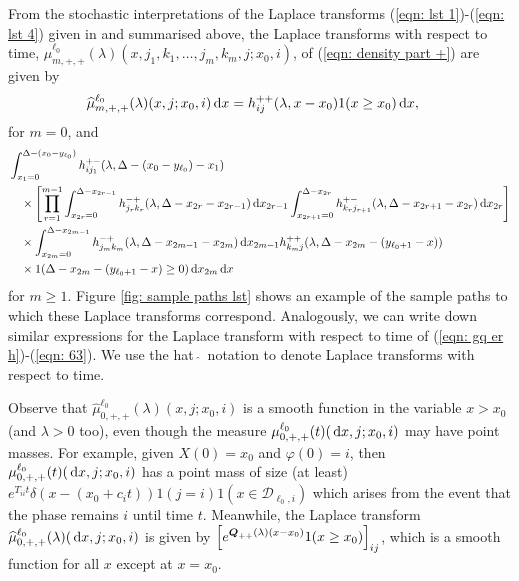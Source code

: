 From the stochastic interpretations of the Laplace transforms (\ref{eqn: lst 1})-(\ref{eqn: lst 4}) given in \citep{bean2005} and summarised above, the Laplace transforms with respect to time, \(\widehat \mu^{\ell_0}_{m,+,+}(\lambda)( x, j_1,k_1,\dots,j_m,k_m, j; x_0,i)\), of (\ref{eqn: density part +}) are given by 
\begin{align*}
	\widehat \mu^{\ell_0}_{m,+,+}(\lambda)( x,j;x_0,i) \, \mathrm{d} x&= h_{ij}^{++}(\lambda,x-x_0)1(x\geq x_0)\, \mathrm{d} x,
\end{align*}
for \(m=0\),  and 
\begin{align}
	\nonumber&\int_{x_1 = 0}^{\Delta-(x_0-y_{\ell_0})} h_{ij_1}^{+-}(\lambda,\Delta-(x_0-y_{\ell_0})-x_1)  %
	\\& \quad \nonumber\times\left[\prod_{r=1}^{m-1} \int_{x_{2r}=0}^{\Delta-x_{2r-1}} h_{j_rk_r}^{-+}(\lambda,\Delta-x_{2r}-x_{2r-1})\wrt x_{2r-1}\int_{x_{2r+1}=0}^{\Delta-x_{2r}}h_{k_{r}j_{r+1}}^{+-}(\lambda,\Delta-x_{2r+1}-x_{2r})\wrt x_{2r}\right]
	\\&\quad\times \int_{x_{2m}=0}^{\Delta-x_{2m-1}} h_{j_{m}k_{m}}^{-+}(\lambda,\Delta -x_{2m-1} - x_{2m}) \wrt x_{2m-1}h_{k_mj}^{++}(\lambda,\Delta -x_{2m}- (y_{\ell_0+1}- x))\nonumber	
	\\&\quad\times 1(\Delta-x_{2m}-(y_{\ell_0+1}-x)\geq 0)\wrt x_{2m} \wrt x \label{eqn: lst herwe}
\end{align} 
for \(m\geq 1\). Figure \ref{fig: sample paths lst} shows an example of the sample paths to which these Laplace transforms correspond.  Analogously, we can write down similar expressions for the Laplace transform with respect to time of (\ref{eqn: gq er h})-(\ref{eqn: 63}). We use the hat \(\,\widehat{}\,\)  notation to denote Laplace transforms with respect to time. 

Observe that \(\widehat \mu^{\ell_0}_{0,+,+}(\lambda)(x,j;x_0,i)\) is a smooth function in the variable \(x> x_0\) (and \(\lambda>0\) too), even though the measure \(\mu^{\ell_0}_{0,+,+}(t)(\, \mathrm{d} x,j;x_0,i)\) may have point masses. For example, given \(X(0)=x_0\) and \(\varphi(0)=i\), then \(\mu^{\ell_0}_{0,+,+}(t)(\, \mathrm{d} x,j;x_0,i)\) has a point mass of size (at least) \(e^{T_{ii}t}\delta(x-(x_0+c_it))1(j=i)1(x\in\mathcal D_{\ell_0,i})\) which arises from the event that the phase remains \(i\) until time \(t\). Meanwhile, the Laplace transform \(\widehat \mu^{\ell_0}_{0,+,+}(\lambda)(\, \mathrm{d} x,j;x_0,i)\) is given by \(\displaystyle \left[e^{\boldsymbol Q_{++}(\lambda)(x-x_0)}1(x\geq x_0)\right]_{ij}\), which is a smooth function for all \(x\) except at \(x=x_0\). 


